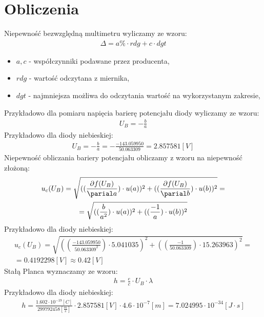 \documentclass[11pt]{article}
\begin{document}
    \section{Obliczenia}
    \noindent Niepewność bezwzględną multimetru wyliczamy ze wzoru:
    \begin{gather*}
        \Delta=a\%\cdot rdg+c\cdot dgt
    \end{gather*}
    {\footnotesize
        \begin{itemize}
            \item[] $a,c$ - współczynniki podawane przez producenta,
            \item[] $rdg$ - wartość odczytana z miernika,
            \item[] $dgt$ - najmniejsza możliwa do odczytania wartość na wykorzystanym zakresie,
        \end{itemize}}
    \noindent Przykładowo dla pomiaru napięcia barierę potencjału diody wyliczamy ze wzoru:
    \begin{gather*}
        U_B=-\frac{b}{a}
    \end{gather*}
    \newpage
    \noindent Przykładowo dla diody niebieskiej:
    \begin{gather*}
        U_B=-\frac{b}{a}=-\frac{-143.059950}{50.063309}=2.857581[V]
    \end{gather*}
    Niepewność obliczania bariery potencjału obliczamy z wzoru na niepewność złożoną:
    \begin{gather*}
        u_c(U_B)=\sqrt{((\frac{\partial f(U_B)}{\parial a})\cdot u(a))^2+((\frac{\partial f(U_B)}{\parial b})\cdot u(b))^2}=\\
        =\sqrt{((\frac{b}{a^2})\cdot u(a))^2+((\frac{-1}{a})\cdot u(b))^2}
    \end{gather*}
    Przykładowo dla diody niebieskiej:
    \begin{gather*}
        u_c(U_B)=\sqrt{((\frac{-143.059950}{50.063309^2})\cdot 5.041035)^2+((\frac{-1}{50.063309})\cdot 15.263963)^2}=\\
        =0.4192298[V]\approx 0.42[V]
    \end{gather*}
    Stałą Planca wyznaczamy ze wzoru:
    \begin{gather*}
        h=\frac{e}{c}\cdot U_B\cdot\lambda
    \end{gather*}
    Przykładowo dla diody niebieskiej:
    \begin{gather*}
        h=\frac{1.602\cdot 10^{-19}[C]}{299792458[\frac{m}{s}]}\cdot 2.857581[V]\cdot 4.6\cdot 10^{-7}[m]=7.024995\cdot 10^{-34}[J\cdot s]
    \end{gather*}
\end{document}
